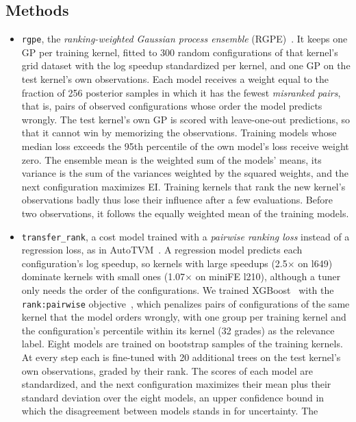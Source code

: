 \documentclass[10pt]{article}
\newcommand{\x}{\ensuremath{\times}}
\newcommand{\code}[1]{\texttt{#1}}
\begin{document}
\subsection{Methods}
\begin{itemize}
\item \code{rgpe}, the \emph{ranking-weighted Gaussian process ensemble}
  (RGPE)~\cite{feurer2018rgpe}. It keeps one GP per training kernel, fitted
  to 300 random configurations of that kernel's grid dataset with the log
  speedup standardized per kernel, and one GP on the test kernel's own
  observations. Each model receives a weight equal to the fraction of 256
  posterior samples in which it has the fewest \emph{misranked pairs}, that
  is, pairs of observed configurations whose order the model predicts wrongly.
  The test kernel's own GP is scored with leave-one-out predictions, so that
  it cannot win by memorizing the observations. Training models whose median
  loss exceeds the 95th percentile of the own model's loss receive weight
  zero. The ensemble mean is the weighted sum of the models' means, its
  variance is the sum of the variances weighted by the squared weights, and
  the next configuration maximizes EI. Training kernels that rank the new
  kernel's observations badly thus lose their influence after a few
  evaluations. Before two observations, it follows the equally weighted mean
  of the training models.
\item \code{transfer\_rank}, a cost model trained with a \emph{pairwise
  ranking loss} instead of a regression loss, as in AutoTVM~\cite{chen2018autotvm}.
  A regression model predicts each configuration's log speedup, so kernels
  with large speedups (2.5\x{} on l649) dominate kernels with small ones
  (1.07\x{} on miniFE l210), although a tuner only needs the order of the
  configurations. We trained XGBoost~\cite{chen2016xgboost} with the
  \code{rank:pairwise} objective~\cite{burges2010ranknet}, which penalizes
  pairs of configurations of the same kernel that the model orders wrongly,
  with one group per training kernel and the configuration's percentile
  within its kernel (32 grades) as the relevance label. Eight models are
  trained on bootstrap samples of the training kernels. At every step each
  is fine-tuned with 20 additional trees on the test kernel's own
  observations, graded by their rank. The scores of each model are
  standardized, and the next configuration maximizes their mean plus their
  standard deviation over the eight models, an upper confidence bound in
  which the disagreement between models stands in for uncertainty. The

\end{itemize}
\end{document}
